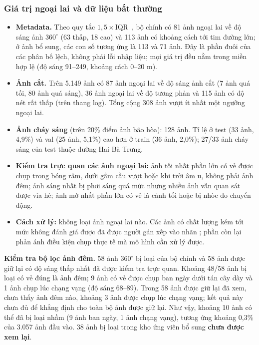 \subsubsection*{Giá trị ngoại lai và dữ liệu bất thường}

\begin{itemize}
  \item \textbf{Metadata.} Theo quy tắc $1{,}5\times$IQR~\cite{tukey1977eda}, bộ chính có 81 ảnh ngoại lai về độ sáng ảnh $360^\circ$ (63 thấp, 18 cao) và 113 ảnh có khoảng cách tới tim đường lớn; ở ảnh bổ sung, các con số tương ứng là 113 và 71 ảnh. Đây là phần đuôi của các phân bố lệch, không phải lỗi nhập liệu; mọi giá trị đều nằm trong miền hợp lệ (độ sáng 91--249, khoảng cách 0--20 m).
  \item \textbf{Ảnh cắt.} Trên 5.149 ảnh có 87 ảnh ngoại lai về độ sáng ảnh cắt (7 ảnh quá tối, 80 ảnh quá sáng), 36 ảnh ngoại lai về độ tương phản và 115 ảnh có độ nét rất thấp (trên thang log). Tổng cộng 308 ảnh vượt ít nhất một ngưỡng ngoại lai.
  \item \textbf{Ảnh cháy sáng} (trên 20\% điểm ảnh bão hòa): 128 ảnh. Tỉ lệ ở test (33 ảnh, 4,9\%) và val (25 ảnh, 5,1\%) cao hơn ở train (36 ảnh, 2,0\%); 27/33 ảnh cháy sáng của test thuộc đường Hai Bà Trưng.
  \item \textbf{Kiểm tra trực quan các ảnh ngoại lai:} ảnh tối nhất phần lớn có vẻ được chụp trong bóng râm, dưới gầm cầu vượt hoặc khi trời âm u, không phải ảnh đêm; ảnh sáng nhất bị phơi sáng quá mức nhưng nhiều ảnh vẫn quan sát được vỉa hè; ảnh mờ nhất phần lớn có vẻ là cảnh tối hoặc bị nhòe do chuyển động.
  \item \textbf{Cách xử lý:} không loại ảnh ngoại lai nào. Các ảnh có chất lượng kém tới mức không đánh giá được đã được người gán xếp vào nhãn ; phần còn lại phản ánh điều kiện chụp thực tế mà mô hình cần xử lý được.
\end{itemize}

\textbf{Kiểm tra bộ lọc ảnh đêm.} 58 ảnh $360^\circ$ bị loại của bộ chính và 58 ảnh được giữ lại có độ sáng thấp nhất đã được kiểm tra trực quan. Khoảng 48/58 ảnh bị loại có vẻ đúng là ảnh đêm; 9 ảnh có vẻ được chụp ban ngày dưới tán cây dày và 1 ảnh chụp lúc chạng vạng (độ sáng 68--89). Trong 58 ảnh được giữ lại đã xem, chưa thấy ảnh đêm nào, khoảng 3 ảnh được chụp lúc chạng vạng; kết quả này chưa đủ để khẳng định cho toàn bộ ảnh được giữ lại. Như vậy, khoảng 10 ảnh có thể đã bị loại nhầm (9 ảnh ban ngày, 1 ảnh chạng vạng), tương ứng khoảng 0,3\% của 3.057 ảnh đầu vào. 38 ảnh bị loại trong kho ứng viên bổ sung \textbf{chưa được xem lại}.

